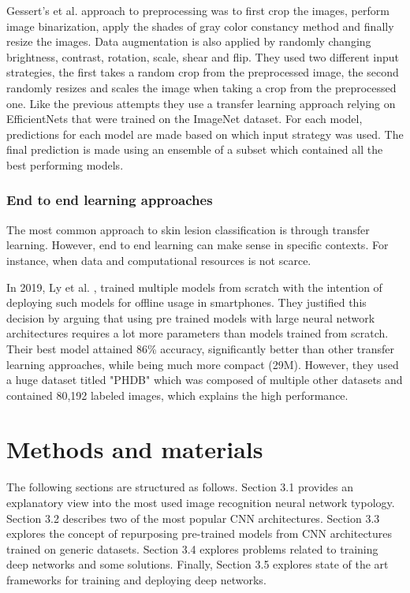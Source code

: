 Gessert's et al. approach to preprocessing was to first crop the images, perform image binarization, apply the shades of gray color constancy method and finally resize the images. Data augmentation is also applied by randomly changing brightness, contrast, rotation, scale, shear and flip. They used two different input strategies, the first takes a random crop from the preprocessed image, the second randomly resizes and scales the image when taking a crop from the preprocessed one. Like the previous attempts they use a transfer learning approach relying on EfficientNets that were trained on the ImageNet dataset. For each model, predictions for each model are made based on which input strategy was used. The final prediction is made using an ensemble of a subset which contained all the best performing models.
\subsubsection{End to end learning approaches}
The most common approach to skin lesion classification is through transfer learning. However, end to end learning can make sense in specific contexts. For instance, when data and computational resources is not scarce. \par 
In 2019, Ly et al. \cite{Ly2019}, trained multiple models from scratch with the intention of deploying such models for offline usage in smartphones. They justified this decision by arguing that using pre trained models with large neural network architectures requires a lot more parameters than models trained from scratch. Their best model attained 86\% accuracy, significantly better than other transfer learning approaches, while being much more compact (29M). However, they used a huge dataset titled "PHDB" which was composed of multiple other datasets and contained 80,192 labeled images, which explains the high performance.


\section{Methods and materials}
The following sections are structured as follows. Section 3.1 provides an explanatory view into the most used image recognition neural network typology. Section 3.2 describes two of the most popular CNN architectures. Section 3.3 explores the concept of repurposing pre-trained models from CNN architectures trained on generic datasets. Section 3.4 explores problems related to training deep networks and some solutions. Finally, Section 3.5 explores state of the art frameworks for training and deploying deep networks.   
